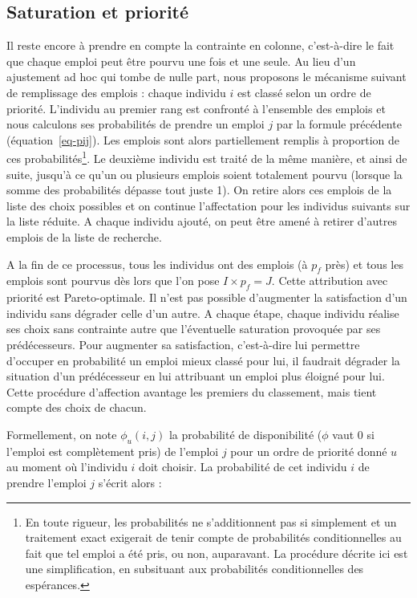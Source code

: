 \documentclass[
  10pt,
  a4paper,
  numbers=noendperiod,
  DIV=9]{scrreprt}
\begin{document}
\hypertarget{sec-priorite}{%
\subsection{Saturation et priorité}\label{sec-priorite}}

Il reste encore à prendre en compte la contrainte en colonne,
c'est-à-dire le fait que chaque emploi peut être pourvu une fois et une
seule. Au lieu d'un ajustement ad hoc qui tombe de nulle part, nous
proposons le mécanisme suivant de remplissage des emplois : chaque
individu \(i\) est classé selon un ordre de priorité. L'individu au
premier rang est confronté à l'ensemble des emplois et nous calculons
ses probabilités de prendre un emploi \(j\) par la formule précédente
(équation~\ref{eq-pij}). Les emplois sont alors partiellement remplis à
proportion de ces probabilités\footnote{En toute rigueur, les
  probabilités ne s'additionnent pas si simplement et un traitement
  exact exigerait de tenir compte de probabilités conditionnelles au
  fait que tel emploi a été pris, ou non, auparavant. La procédure
  décrite ici est une simplification, en subsituant aux probabilités
  conditionnelles des espérances.}. Le deuxième individu est traité de
la même manière, et ainsi de suite, jusqu'à ce qu'un ou plusieurs
emplois soient totalement pourvu (lorsque la somme des probabilités
dépasse tout juste 1). On retire alors ces emplois de la liste des choix
possibles et on continue l'affectation pour les individus suivants sur
la liste réduite. A chaque individu ajouté, on peut être amené à retirer
d'autres emplois de la liste de recherche.

A la fin de ce processus, tous les individus ont des emplois (à \(p_f\)
près) et tous les emplois sont pourvus dès lors que l'on pose
\(I \times p_f = J\). Cette attribution avec priorité est
Pareto-optimale. Il n'est pas possible d'augmenter la satisfaction d'un
individu sans dégrader celle d'un autre. A chaque étape, chaque individu
réalise ses choix sans contrainte autre que l'éventuelle saturation
provoquée par ses prédécesseurs. Pour augmenter sa satisfaction,
c'est-à-dire lui permettre d'occuper en probabilité un emploi mieux
classé pour lui, il faudrait dégrader la situation d'un prédécesseur en
lui attribuant un emploi plus éloigné pour lui. Cette procédure
d'affection avantage les premiers du classement, mais tient compte des
choix de chacun.

Formellement, on note \(\phi_u(i,j)\) la probabilité de disponibilité
(\(\phi\) vaut 0 si l'emploi est complètement pris) de l'emploi \(j\)
pour un ordre de priorité donné \(u\) au moment où l'individu \(i\) doit
choisir. La probabilité de cet individu \(i\) de prendre l'emploi \(j\)
s'écrit alors :
\end{document}
